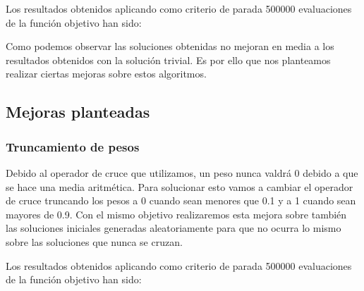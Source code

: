 \documentclass{article}
\begin{document}
Los resultados obtenidos aplicando como criterio de parada 500000 evaluaciones de la función objetivo han sido:
\begin{table}[H]
	\begin{center}
		\caption{Algoritmos genéticos.}
		\label{tabla:a1}
	\end{center}
\end{table}

Como podemos observar las soluciones obtenidas no mejoran en media a los resultados obtenidos con la solución trivial. Es por ello que nos planteamos realizar ciertas mejoras sobre estos algoritmos.
\subsection{Mejoras planteadas}
\subsubsection{Truncamiento de pesos}
Debido al operador de cruce que utilizamos, un peso nunca valdrá 0 debido a que se hace una media aritmética. Para solucionar esto vamos a cambiar el operador de cruce truncando los pesos a 0 cuando sean menores que 0.1 y a 1 cuando sean mayores de 0.9. Con el mismo objetivo realizaremos esta mejora sobre también las soluciones iniciales generadas aleatoriamente para que no ocurra lo mismo sobre las soluciones que nunca se cruzan.

Los resultados obtenidos aplicando como criterio de parada 500000 evaluaciones de la función objetivo han sido:
\begin{table}[H]
	\begin{center}
		\caption{Algoritmos genéticos con truncamiento de pesos}
		\label{tabla:a2}
	\end{center}
\end{table}
\end{document}
